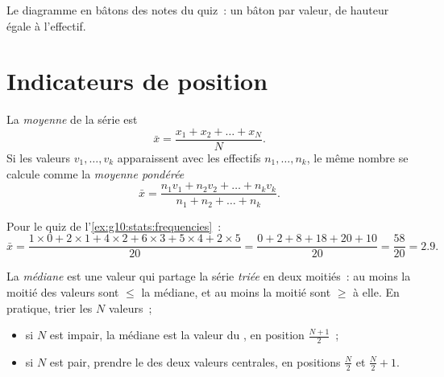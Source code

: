 \begin{omfigure}

{\small Le diagramme en bâtons des notes du quiz~: un bâton par valeur,
de hauteur égale à l'effectif.}
\end{omfigure}

\section{Indicateurs de position}

\begin{definition}[Moyenne]\label{def:g10:stats:mean}
La \emph{moyenne} de la série est
\[
\bar x = \frac{x_1 + x_2 + \dots + x_N}{N}.
\]
Si les valeurs $v_1, \dots, v_k$ apparaissent avec les effectifs
$n_1, \dots, n_k$, le même nombre se calcule comme la \emph{moyenne
pondérée}
\[
\bar x = \frac{n_1 v_1 + n_2 v_2 + \dots + n_k v_k}{n_1 + n_2 + \dots + n_k}.
\]
\end{definition}

\begin{example}\label{ex:g10:stats:mean}
Pour le quiz de l'\cref{ex:g10:stats:frequencies}~:
\[
\bar x = \frac{1 \times 0 + 2 \times 1 + 4 \times 2 + 6 \times 3
+ 5 \times 4 + 2 \times 5}{20}
= \frac{0 + 2 + 8 + 18 + 20 + 10}{20}
= \frac{58}{20} = 2.9 .
\]
\end{example}

\begin{definition}[Médiane]\label{def:g10:stats:median}
La \emph{médiane} est une valeur qui partage la série
\emph{triée} en deux moitiés~: au moins la moitié des valeurs sont
$\leq$ la médiane, et au moins la moitié sont $\geq$ à elle. En
pratique, trier les $N$ valeurs~;
\begin{itemize}
  \item si $N$ est impair, la médiane est la valeur du , en
        position $\frac{N+1}{2}$~;
  \item si $N$ est pair, prendre le  des deux valeurs centrales, en
        positions $\frac N2$ et $\frac N2 + 1$.
\end{itemize}
\end{definition}

